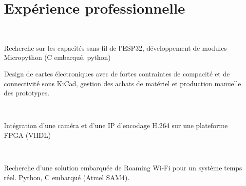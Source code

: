\documentclass[]{cv-template}
\begin{document}
\begin{minipage}[t]{0.65\textwidth} 

\section{Expérience professionnelle}
\\
    \vspace{0.9em} %
\begin{tightemize}
\item Recherche sur les capacités sans-fil de l'ESP32, développement de modules Micropython (C embarqué, python)
\item Design de cartes électroniques avec de fortes contraintes de compacité et de connectivité sous KiCad, gestion des achats de matériel et production manuelle des prototypes.
\end{tightemize}
\sectionsep

\\
\begin{tightemize}
\item Intégration d'une caméra et d'une IP d'encodage H.264 sur une plateforme FPGA (VHDL)
\end{tightemize}
\sectionsep

\\
\begin{tightemize}
\item Recherche d'une solution embarquée de Roaming Wi-Fi pour un système temps réel. Python, C embarqué (Atmel SAM4).
\end{tightemize}
\sectionsep



\end{minipage}
\end{document}
